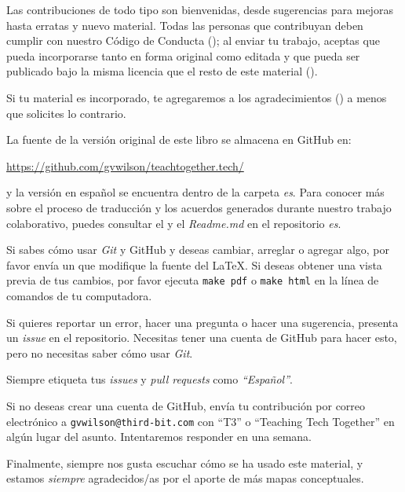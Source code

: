 
Las contribuciones de todo tipo son bienvenidas,
desde sugerencias para mejoras hasta erratas y nuevo material.
Todas las personas que contribuyan deben cumplir con nuestro Código de Conducta ();
al enviar tu trabajo,
aceptas que pueda incorporarse tanto en forma original como editada
y que pueda ser publicado bajo la misma licencia que el resto de este material ().

Si tu material es incorporado,
te agregaremos a los agradecimientos () a menos que solicites lo contrario.

La fuente de la versión original de este libro se almacena en GitHub en:

\begin{center}
  \url{https://github.com/gvwilson/teachtogether.tech/}
\end{center}

y la versión en español se encuentra dentro de la carpeta \emph{es}.
Para conocer más sobre el proceso de traducción y los acuerdos generados durante nuestro trabajo colaborativo, 
puedes consultar el  y el \emph{Readme.md} en el repositorio \emph{es}.


\noindent
Si sabes cómo usar \emph{Git} y GitHub y deseas cambiar, arreglar o agregar algo,
por favor envía un  que modifique la fuente del LaTeX.
Si deseas obtener una vista previa de tus cambios,
por favor ejecuta \texttt{make~pdf} o \texttt{make~html} en la línea de comandos de tu computadora.

Si quieres reportar un error,
hacer una pregunta
o hacer una sugerencia,
presenta un \emph{issue} en el repositorio.
Necesitas tener una cuenta de GitHub para hacer esto,
pero no necesitas saber cómo usar \emph{Git}.

Siempre etiqueta tus \emph{issues} y \emph{pull requests} 
como \emph{``Español''}.

Si no deseas crear una cuenta de GitHub,
envía tu contribución por correo electrónico a \texttt{gvwilson@third-bit.com}
con ``T3'' o ``Teaching Tech Together'' en algún lugar del asunto.
Intentaremos responder en una semana.

Finalmente,
siempre nos gusta escuchar cómo se ha usado este material,
y estamos \emph{siempre} agradecidos/as por el aporte de más mapas conceptuales.
